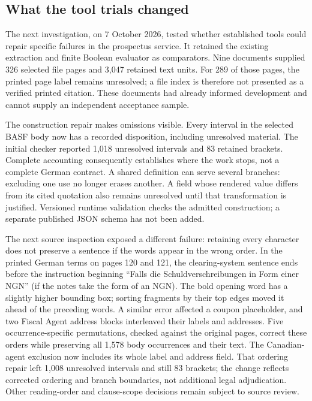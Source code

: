 \subsection{What the tool trials changed}
\label{sec:prospectus-adoption-executed}

The next investigation, on 7 October 2026, tested whether established tools
could repair specific failures in the prospectus service. It retained the
existing extraction and finite Boolean evaluator as comparators. Nine documents
supplied 326 selected file pages and 3,047 retained text units. For 289 of those
pages, the printed page label remains unresolved; a file index is therefore not
presented as a verified printed citation. These documents had already informed
development and cannot supply an independent acceptance sample.

The construction repair makes omissions visible. Every interval in the selected
BASF body now has a recorded disposition, including unresolved material. The
initial checker reported 1,018 unresolved intervals and 83 retained brackets.
Complete accounting consequently establishes where the work stops,
not a complete German contract. A shared definition can serve several branches:
excluding one use no longer erases another. A field whose rendered value differs
from its cited quotation also remains unresolved until that transformation is
justified. Versioned runtime validation checks the admitted construction; a
separate published JSON schema has not been added.

\begingroup
{}
The next source inspection exposed a different failure: retaining every character
does not preserve a sentence if the words appear in the wrong order. In the
printed German terms on pages 120 and 121, the clearing-system sentence ends
before the instruction beginning ``Falls die Schuldverschreibungen in Form
einer NGN'' (if the notes take the form of an NGN). The bold opening word has a
slightly higher bounding box; sorting fragments by their top edges moved it
ahead of the preceding words. A similar error affected a coupon placeholder,
and two Fiscal Agent address blocks interleaved their labels and addresses.
Five occurrence-specific permutations, checked against the original pages,
correct these orders while preserving all 1,578 body occurrences and their text.
The Canadian-agent exclusion now includes its whole label and address field.
That ordering repair left 1,008 unresolved intervals and still 83 brackets;
the change reflects corrected ordering and branch boundaries, not additional
legal adjudication. Other reading-order and clause-scope decisions remain subject
to source review.
\par\endgroup

